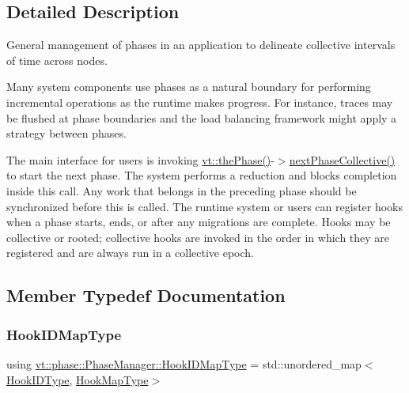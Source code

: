 \subsection{Detailed Description}
General management of phases in an application to delineate collective intervals of time across nodes. 

Many system components use phases as a natural boundary for performing incremental operations as the runtime makes progress. For instance, traces may be flushed at phase boundaries and the load balancing framework might apply a strategy between phases.

The main interface for users is invoking {\ttfamily \hyperlink{namespacevt_a3799d6b51fb71d7b6505760aad457e61}{vt\+::the\+Phase()}-\/$>$\hyperlink{structvt_1_1phase_1_1_phase_manager_ac94bfde4a103cbdec426542191c41092}{next\+Phase\+Collective()}} to start the next phase. The system performs a reduction and blocks completion inside this call. Any work that belongs in the preceding phase should be synchronized before this is called. The runtime system or users can register hooks when a phase starts, ends, or after any migrations are complete. Hooks may be collective or rooted; collective hooks are invoked in the order in which they are registered and are always run in a collective epoch. 

\subsection{Member Typedef Documentation}
\mbox{\label{structvt_1_1phase_1_1_phase_manager_a7f9784fa7550beaa1e7d59e639169a8b}} 
\subsubsection{\texorpdfstring{Hook\+I\+D\+Map\+Type}{HookIDMapType}}
{\footnotesize\ttfamily using \hyperlink{structvt_1_1phase_1_1_phase_manager_a7f9784fa7550beaa1e7d59e639169a8b}{vt\+::phase\+::\+Phase\+Manager\+::\+Hook\+I\+D\+Map\+Type} =  std\+::unordered\+\_\+map$<$\hyperlink{structvt_1_1phase_1_1_phase_manager_a552ed398953e67cd97c440a7f39a8a6c}{Hook\+I\+D\+Type}, \hyperlink{structvt_1_1phase_1_1_phase_manager_aa8583887716955f4bd4f438bc26141e9}{Hook\+Map\+Type}$>$}

